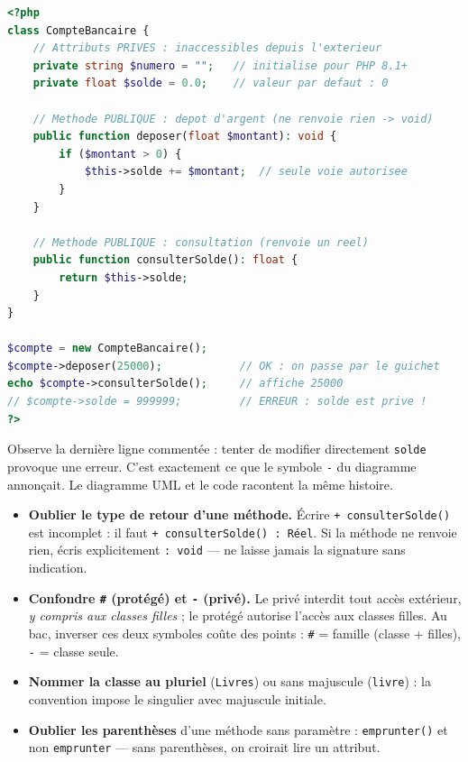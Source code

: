 \documentclass[11pt]{article}
\begin{document}
\begin{lstlisting}[language=Php]
<?php
class CompteBancaire {
    // Attributs PRIVES : inaccessibles depuis l'exterieur
    private string $numero = "";   // initialise pour PHP 8.1+
    private float $solde = 0.0;    // valeur par defaut : 0

    // Methode PUBLIQUE : depot d'argent (ne renvoie rien -> void)
    public function deposer(float $montant): void {
        if ($montant > 0) {
            $this->solde += $montant;  // seule voie autorisee
        }
    }

    // Methode PUBLIQUE : consultation (renvoie un reel)
    public function consulterSolde(): float {
        return $this->solde;
    }
}

$compte = new CompteBancaire();
$compte->deposer(25000);            // OK : on passe par le guichet
echo $compte->consulterSolde();     // affiche 25000
// $compte->solde = 999999;         // ERREUR : solde est prive !
?>
\end{lstlisting}

Observe la dernière ligne commentée : tenter de modifier directement \texttt{solde} provoque une erreur. C'est exactement ce que le symbole \texttt{-} du diagramme annonçait. Le diagramme UML et le code racontent la même histoire.

\begin{attention}
\begin{itemize}
\item \textbf{Oublier le type de retour d'une méthode.} Écrire \texttt{+ consulterSolde()} est incomplet : il faut \texttt{+ consulterSolde() : R\'eel}. Si la méthode ne renvoie rien, écris explicitement \texttt{: void} — ne laisse jamais la signature sans indication.
\item \textbf{Confondre \texttt{\#} (protégé) et \texttt{-} (privé).} Le privé interdit tout accès extérieur, \emph{y compris aux classes filles} ; le protégé autorise l'accès aux classes filles. Au bac, inverser ces deux symboles coûte des points : \texttt{\#} = famille (classe + filles), \texttt{-} = classe seule.
\item \textbf{Nommer la classe au pluriel} (\texttt{Livres}) ou sans majuscule (\texttt{livre}) : la convention impose le singulier avec majuscule initiale.
\item \textbf{Oublier les parenthèses} d'une méthode sans paramètre : \texttt{emprunter()} et non \texttt{emprunter} — sans parenthèses, on croirait lire un attribut.
\end{itemize}
\end{attention}
\end{document}

